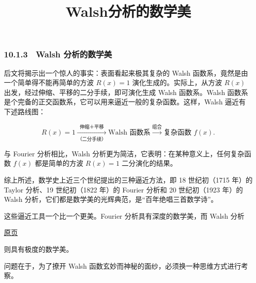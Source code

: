 \documentclass[
  10pt,
  fontset=fandol]{ctexart}
\title{Walsh分析的数学美}
\author{}
\date{}
\begin{document}
\maketitle

\subsubsection{10.1.3　Walsh 分析的数学美}\label{walsh-ux5206ux6790ux7684ux6570ux5b66ux7f8e}

后文将揭示出一个惊人的事实：表面看起来极其复杂的 Walsh 函数系，竟然是由一个简单得不能再简单的方波 \(R(x)=1\) 演化生成的。实际上，从方波 \(R(x)\) 出发，经过伸缩、平移的二分手续，即可演化生成 Walsh 函数系。Walsh 函数系是个完备的正交函数系，它可以用来逼近一般的复杂函数。这样，Walsh 逼近有下述路线图：

\[
R(x)=1\xrightarrow[\text{（二分手续）}]{\text{伸缩＋平移}}\text{Walsh 函数系}\xrightarrow{\text{组合}}\text{复杂函数 }f(x).
\]

与 Fourier 分析相比，Walsh 分析更为简洁，它表明：在某种意义上，任何复杂函数 \(f(x)\) 都是简单的方波 \(R(x)=1\) 二分演化的结果。

综上所述，数学史上近三个世纪提出的三种逼近方法，即 18 世纪初（1715 年）的 Taylor 分析、19 世纪初（1822 年）的 Fourier 分析和 20 世纪初（1923 年）的 Walsh 分析，它们都是数学美的光辉典范，是``百年绝唱三首数学诗''。

这些逼近工具一个比一个更美。Fourier 分析具有深度的数学美，而 Walsh 分析

\href{../../source-images/pdf-264.jpeg}{原页}

则具有极度的数学美。

问题在于，为了撩开 Walsh 函数玄妙而神秘的面纱，必须换一种思维方式进行考察。
\end{document}
